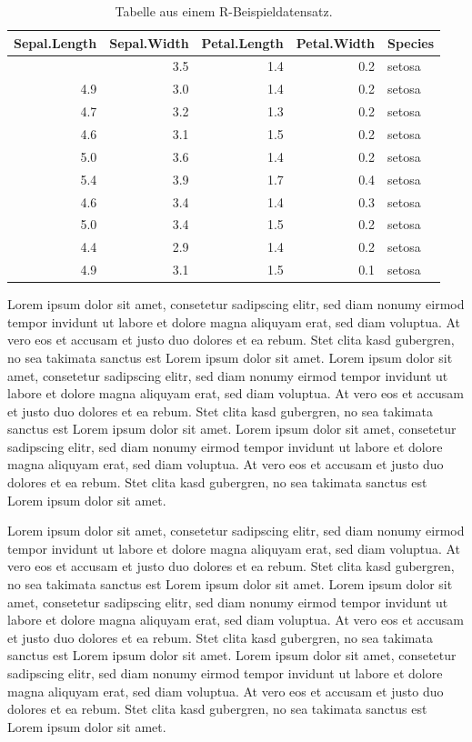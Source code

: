 \documentclass[
  11pt,
  a4paper,
]{tudscrreprt}
\begin{document}
\begin{longtable}[]{@{}rrrrl@{}}

\caption{\label{tbl-beispieltabelle}Tabelle aus einem
R-Beispieldatensatz.}

\tabularnewline

\toprule\noalign{}
Sepal.Length & Sepal.Width & Petal.Length & Petal.Width & Species \\
\midrule\noalign{}
\endhead
\bottomrule\noalign{}
\endlastfoot
5.1 & 3.5 & 1.4 & 0.2 & setosa \\
4.9 & 3.0 & 1.4 & 0.2 & setosa \\
4.7 & 3.2 & 1.3 & 0.2 & setosa \\
4.6 & 3.1 & 1.5 & 0.2 & setosa \\
5.0 & 3.6 & 1.4 & 0.2 & setosa \\
5.4 & 3.9 & 1.7 & 0.4 & setosa \\
4.6 & 3.4 & 1.4 & 0.3 & setosa \\
5.0 & 3.4 & 1.5 & 0.2 & setosa \\
4.4 & 2.9 & 1.4 & 0.2 & setosa \\
4.9 & 3.1 & 1.5 & 0.1 & setosa \\

\end{longtable}

Lorem ipsum dolor sit amet, consetetur sadipscing elitr, sed diam nonumy
eirmod tempor invidunt ut labore et dolore magna aliquyam erat, sed diam
voluptua. At vero eos et accusam et justo duo dolores et ea rebum. Stet
clita kasd gubergren, no sea takimata sanctus est Lorem ipsum dolor sit
amet. Lorem ipsum dolor sit amet, consetetur sadipscing elitr, sed diam
nonumy eirmod tempor invidunt ut labore et dolore magna aliquyam erat,
sed diam voluptua. At vero eos et accusam et justo duo dolores et ea
rebum. Stet clita kasd gubergren, no sea takimata sanctus est Lorem
ipsum dolor sit amet. Lorem ipsum dolor sit amet, consetetur sadipscing
elitr, sed diam nonumy eirmod tempor invidunt ut labore et dolore magna
aliquyam erat, sed diam voluptua. At vero eos et accusam et justo duo
dolores et ea rebum. Stet clita kasd gubergren, no sea takimata sanctus
est Lorem ipsum dolor sit amet.

Lorem ipsum dolor sit amet, consetetur sadipscing elitr, sed diam nonumy
eirmod tempor invidunt ut labore et dolore magna aliquyam erat, sed diam
voluptua. At vero eos et accusam et justo duo dolores et ea rebum. Stet
clita kasd gubergren, no sea takimata sanctus est Lorem ipsum dolor sit
amet. Lorem ipsum dolor sit amet, consetetur sadipscing elitr, sed diam
nonumy eirmod tempor invidunt ut labore et dolore magna aliquyam erat,
sed diam voluptua. At vero eos et accusam et justo duo dolores et ea
rebum. Stet clita kasd gubergren, no sea takimata sanctus est Lorem
ipsum dolor sit amet. Lorem ipsum dolor sit amet, consetetur sadipscing
elitr, sed diam nonumy eirmod tempor invidunt ut labore et dolore magna
aliquyam erat, sed diam voluptua. At vero eos et accusam et justo duo
dolores et ea rebum. Stet clita kasd gubergren, no sea takimata sanctus
est Lorem ipsum dolor sit amet.
\end{document}
